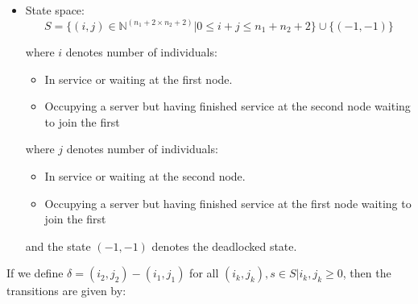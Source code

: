 \documentclass{article}
\begin{document}
\begin{itemize}
    \item State space:
        \[S = \{(i,j)\in\mathbb{N}^{(n_1+2\times n_2+2)}| 0 \leq i + j \leq n_1 + n_2 + 2
        \}\cup\{(-1, -1)\}\]

        where \(i\) denotes number of individuals:
            \begin{itemize}
                \item In service or waiting at the first node.
                \item Occupying a server but having finished service at the
                    second node waiting to join the first
            \end{itemize}
        where \(j\) denotes number of individuals:
            \begin{itemize}
                \item In service or waiting at the second node.
                \item Occupying a server but having finished service at the
                    first node waiting to join the first
            \end{itemize}
        and the state $(-1, -1)$ denotes the deadlocked state.
\end{itemize}

If we define $\delta = (i_2, j_2) - (i_1, j_1)$ for all $(i_k, j_k), s \in S | i_k, j_k \geq 0$, then the transitions are given by:
\end{document}
